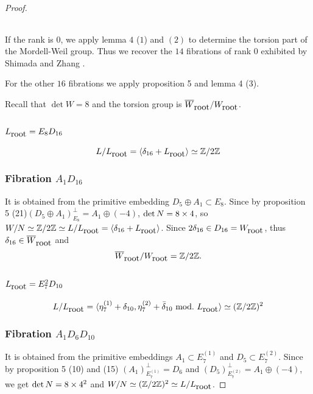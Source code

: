 \documentclass{amsart}
\begin{document}
\begin{proof}
\begin{center}
\begin{tabular}{|l|c|}
\end{tabular}
\end{center}



If the rank is $0$, we apply lemma $4$ ($1$) and $(2)$ to determine the torsion part of the Mordell-Weil group. Thus we recover the $14$ fibrations of rank $0$ exhibited by Shimada and Zhang \cite{Shim}.

For the other $16$ fibrations we apply proposition 5 and lemma 4 (3).

Recall that $\det  W =8$ and the torsion group is $\overline{W}_{\hbox{root}}/W_{\hbox{root}}$.



\subsection{$L_{\hbox{root}}=E_8D_{16}$}
 $$L/L_{\hbox{root}}=\langle \delta_{16} +L_{\hbox{root}}\rangle \simeq \mathbb Z /{2 \mathbb Z}$$

\subsubsection{Fibration $A_1D_{16}$}
It is obtained from the primitive embedding $D_5\oplus A_1\subset E_8$.
Since by proposition 5 (21)$(D_5\oplus A_1)_{E_8}^{\perp}=A_1\oplus (-4)$, $\hbox{det}\,N=8\times 4$, so $W/N \simeq \mathbb Z /2\mathbb Z \simeq L/L_{\hbox{root}}=\langle \delta_{16}+L_{\hbox{root}} \rangle$. Since $2\delta_{16}\in D_{16} =W_{\hbox{root}}$, thus $\delta_{16} \in \overline{W}_{\hbox{root}}$ and
$$\overline{W}_{\hbox{root}}/W_{\hbox{root}}= \mathbb Z /2\mathbb Z.$$




\subsection{$L_{\hbox{root}}=E_7^2D_{10}$}
 $$L/L_{\hbox{root}}=\langle \eta_7^{(1)}+\delta_{10}, \eta_7^{(2)}+\bar{\delta}_{10}\,\,{\hbox{mod.}}\,\,L_{\hbox{root}} \rangle \simeq (\mathbb Z /{2 \mathbb Z})^2 $$


\subsubsection {Fibration $A_1D_6D_{10}$}
It is obtained from the primitive embeddings $A_1 \subset E_7^{(1)}$ and $D_5 \subset E_7^{(2)}$.
Since by proposition 5 (10) and (15) $(A_1)_{E_7^{(1)}}^{\perp}=D_6$ and $(D_5)_{E_7^{(2)}}^{\perp}=A_1 \oplus (-4)$, we get $\hbox{det}\,N=8\times 4^2$ and $W/N\simeq (\mathbb Z/2 \mathbb Z )^2\simeq L/L_{\hbox{root}}$.


\end{proof}
\end{document}
